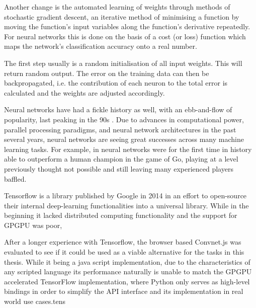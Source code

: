 
Another change is the automated learning of weights through methods of stochastic gradient descent, an iterative method of minimising a function by moving the function's input variables along the function's derivative repeatedly. For neural networks this is done on the basis of a cost (or loss) function which maps the network's classification accuracy onto a real number. 

The first step usually is a random initialisation of all input weights. This will return random output. The error on the training data can then be backpropagated, i.e. the contribution of each neuron to the total error is calculated and the weights are adjusted accordingly.

 

 Neural networks have had a fickle history as well, with an ebb-and-flow of popularity, last peaking in the 90s \cite{Bengio91z}.  Due to advances in computational power, parallel processing paradigms, and neural network architectures in the past several years, neural networks are seeing great successes across many machine learning tasks. For example, in \cite{Silver:2016aa} neural networks were for the first time in history able to outperform a human champion in the game of Go, playing at a level previously thought not possible and still leaving many experienced players baffled.  





Tensorflow is a library published by Google in 2014 in an effort to open-source their internal deep-learning functionalities into a universal library. While in the beginning it lacked distributed computing functionality and the support for GPGPU was poor, 


After a longer experience with Tensorflow, the browser based Convnet.js was evaluated to see if it could be used as a viable alternative for the tasks in this thesis.
While it being a java script implementation, due to the characteristics of any scripted language its performance naturally is unable to match the GPGPU accelerated TensorFlow implementation, where Python only serves as high-level bindings in order to simplify the API interface and its implementation in real world use cases.tens

